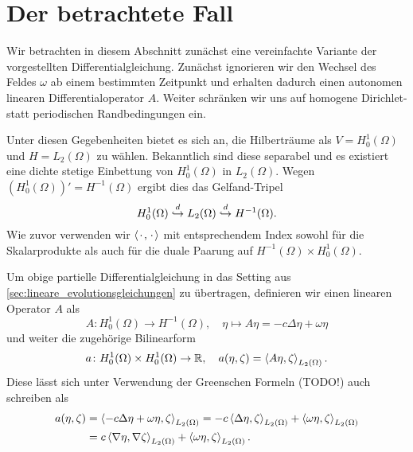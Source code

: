 

\section{Der betrachtete Fall} %
\label{sec:der_betrachtete_fall}

Wir betrachten in diesem Abschnitt zunächst eine vereinfachte Variante der vorgestellten Differentialgleichung.
Zunächst ignorieren wir den Wechsel des Feldes $\omega$ ab einem bestimmten Zeitpunkt und erhalten dadurch einen autonomen linearen Differentialoperator $A$.
Weiter schränken wir uns auf homogene Dirichlet- statt periodischen Randbedingungen ein.

Unter diesen Gegebenheiten bietet es sich an, die Hilberträume als $V = H^{1}_{0}(\Omega)$ und $H = L_{2}(\Omega)$ zu wählen.
Bekanntlich sind diese separabel und es existiert eine dichte stetige Einbettung von $H^{1}_{0}(\Omega)$ in $L_{2}(\Omega)$.
Wegen $(H^{1}_{0}(\Omega))' = H^{-1}(\Omega)$ ergibt dies das Gelfand-Tripel
\begin{equation}
    H^{1}_{0}(\Omega) \stackrel{d}{\hookrightarrow} L_{2}(\Omega) \stackrel{d}{\hookrightarrow} H^{-1}(\Omega).
\end{equation}
Wie zuvor verwenden wir $\left\langle{\mkern2mu\cdot\mkern2mu},{\mkern2mu\cdot\mkern2mu}\right\rangle$ mit entsprechendem Index sowohl für die Skalarprodukte als auch für die duale Paarung auf $H^{-1}(\Omega) \times H^{1}_{0}(\Omega)$.

Um obige partielle Differentialgleichung in das Setting aus \autoref{sec:lineare_evolutionsgleichungen} zu übertragen, definieren wir einen linearen Operator $A$ als
\begin{equation}
    \label{eq:def_op_A}
    A \colon H^{1}_{0}(\Omega) \to H^{-1}(\Omega), \quad \eta \mapsto A \eta = - c \Delta \eta + \omega \eta
\end{equation}
und weiter die zugehörige Bilinearform
\begin{equation}
    a \colon H^{1}_{0}(\Omega) \times H^{1}_{0}(\Omega) \to \mathbb{R}, \quad a(\eta, \zeta) = \left\langle A \eta,\zeta\right\rangle_{L_{2}(\Omega)}.
\end{equation}
Diese lässt sich unter Verwendung der Greenschen Formeln (TODO!) auch schreiben als
\begin{equation}
    \begin{aligned}
        a(\eta, \zeta)
        &= \left\langle- c \Delta \eta + \omega \eta,\zeta\right\rangle_{L_{2}(\Omega)}
        = - c \left\langle\Delta \eta,\zeta\right\rangle_{L_{2}(\Omega)} + \left\langle\omega \eta,\zeta\right\rangle_{L_{2}(\Omega)}
        \\&= c \left\langle\nabla \eta,\nabla \zeta\right\rangle_{L_{2}(\Omega)} + \left\langle\omega \eta,\zeta\right\rangle_{L_{2}(\Omega)}.
    \end{aligned}
\end{equation}

